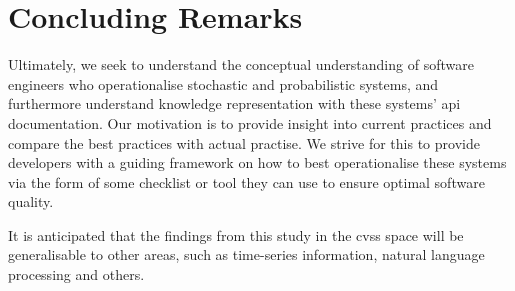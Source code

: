 \section{Concluding Remarks}

Ultimately, we seek to understand the conceptual understanding of software engineers who operationalise stochastic and probabilistic systems, and furthermore understand knowledge representation with these systems' \gls{api} documentation. Our motivation is to provide insight into current practices and compare the best practices with actual practise. We strive for this to  provide developers with a guiding framework on how to best operationalise these systems via the form of some checklist or tool they can use to ensure optimal software quality.

It is anticipated that the findings from this study in the \glspl{cvs} space will be generalisable to other areas, such as time-series information, natural language processing and others.

